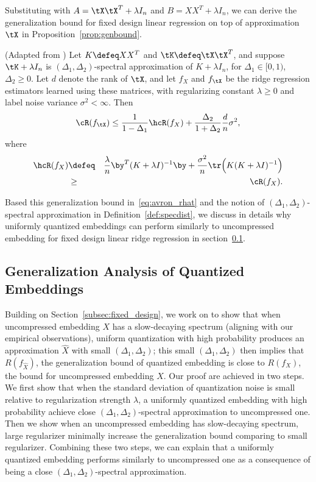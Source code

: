 Substituting with $A=\tX\tX^T + \lambda I_n$ and $B=XX^T + \lambda I_n$, we can derive the generalization bound for fixed design linear regression on top of approximation $\tX$ in Proposition~\ref{prop:genbound}.
\begin{proposition}{(Adapted from \citep{lprff18})}
	Let $K \defeq XX^T$ and $\tK \defeq \tX\tX^T$, and suppose $\tK + \lambda I_n$ is $(\Delta_1, \Delta_2)$-spectral approximation of $K+\lambda I_n$, for $\Delta_1 \in [0,1)$, $\Delta_2 \geq 0$.
	Let $d$ denote the rank of $\tX$, and let $f_{X}$ and $f_{\tX}$ be the ridge regression estimators learned using these matrices, with regularizing constant $\lambda \geq 0$ and label noise variance $\sigma^2 < \infty$. Then
	\begin{equation}
	\cR(f_{\tX}) \leq \frac{1}{1-\Delta_1} \hcR(f_X) +  \frac{\Delta_2}{1+\Delta_2}\frac{d}{n}\sigma^2,
	\label{eq:risk_bound}
	\end{equation}
	where 
	\begin{eqnarray*}
	\hcR(f_X) &\defeq& \frac{\lambda}{n} \by^T(K+\lambda I)^{-1}\by + \frac{\sigma^2}{n}\tr\Big(K(K+\lambda I)^{-1}\Big) \\
	&\geq& \cR(f_X).
	\label{eq:avron_rhat}
	\end{eqnarray*}
	\label{prop:genbound}
\end{proposition}

Based this generalization bound in~\eqref{eq:avron_rhat} and the notion of $(\Delta_1, \Delta_2)$-spectral approximation in Definition~\ref{def:specdist}, we discuss in details why uniformly quantized embeddings can perform similarly to uncompressed embedding for fixed design linear ridge regression in section~\ref{subsec:theo_core}.

\subsection{Generalization Analysis of Quantized Embeddings}
\label{subsec:theo_core}
Building on Section~\ref{subsec:fixed_design}, we work on to show that when uncompressed embedding $X$ has a slow-decaying spectrum (aligning with our empirical observations), uniform quantization with high probability produces an approximation $\hat{X}$ with small $(\Delta_1, \Delta_2)$; this small $(\Delta_1, \Delta_2)$ then implies that $R(f_{\hat{X}})$, the generalization bound of quantized embedding is close to $R(f_{X})$, the bound for uncompressed embedding $X$. Our proof are achieved in two steps. We first show that when the standard deviation of quantization noise is small relative to regularization strength $\lambda$, a uniformly quantized embedding with high probability achieve close $(\Delta_1, \Delta_2)$-spectral approximation to uncompressed one. Then we show when an uncompressed embedding has slow-decaying spectrum, large regularizer minimally increase the generalization bound comparing to small regularizer. Combining these two steps, we can explain that a uniformly quantized embedding performs similarly to uncompressed one as a consequence of being a close $(\Delta_1, \Delta_2)$-spectral approximation.


